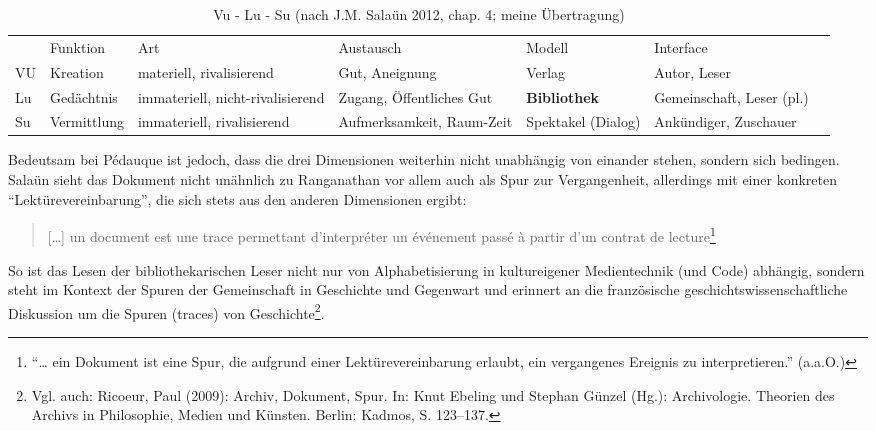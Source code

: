 \newpage

\begin{table}
\small
\begin{tabular}{p{2cm}p{2cm}p{2cm}p{2cm}p{2cm}p{2cm}p{2cm}}
\toprule
& Funktion & Art & Austausch & Modell & Interface \\
\cmidrule(r){1-1} \cmidrule(r){2-2} \cmidrule(r){3-3} \cmidrule(r){4-4} \cmidrule(r){5-5} \cmidrule(r){6-6}
VU & Kreation & materiell, rivalisierend & Gut, Aneignung & Verlag &
Autor, Leser\\
Lu & Gedächtnis & immateriell, nicht-rivalisierend & Zugang,
Öffentliches Gut & \textbf{Bibliothek} & Gemeinschaft, Leser
(pl.)\\
Su & Vermittlung & immateriell, rivalisierend & Auf\-merk\-samkeit,
Raum-Zeit & Spektakel (Dialog) & Ankündiger, Zuschauer\\
\cmidrule(r){1-1} \cmidrule(r){2-2} \cmidrule(r){3-3} \cmidrule(r){4-4} \cmidrule(r){5-5} \cmidrule(r){6-6}
\bottomrule
\end{tabular}
\caption{Vu - Lu - Su (nach J.M. Salaün 2012, chap. 4; meine
Übertragung)}
\end{table}

\newpage

Bedeutsam bei Pédauque ist jedoch, dass die drei Dimensionen weiterhin
nicht unabhängig von einander stehen, sondern sich bedingen. Salaün
sieht das Dokument nicht unähnlich zu Ranganathan vor allem auch als
Spur zur Vergangenheit, allerdings mit einer konkreten
\enquote{Lektürevereinbarung}, die sich stets aus den anderen Dimensionen
ergibt:

\begin{quote}
{[}\ldots{}{]} un document est une trace permettant d'interpréter un
événement passé à partir d'un contrat de lecture\footnote{\enquote{\ldots{} ein
  Dokument ist eine Spur, die aufgrund einer Lektürevereinbarung
  erlaubt, ein vergangenes Ereignis zu interpretieren.} (a.a.O.)}
\end{quote}

So ist das Lesen der bibliothekarischen Leser nicht nur von
Alphabetisierung in kultureigener Medientechnik (und Code) abhängig,
sondern steht im Kontext der Spuren der Gemeinschaft in Geschichte und
Gegenwart und erinnert an die französische geschichtswissenschaftliche
Diskussion um die Spuren (traces) von Geschichte\footnote{Vgl. auch:
  Ricoeur, Paul (2009): Archiv, Dokument, Spur. In: Knut Ebeling und
  Stephan Günzel (Hg.): Archivologie. Theorien des Archivs in
  Philosophie, Medien und Künsten. Berlin: Kadmos, S. 123--137.}.

